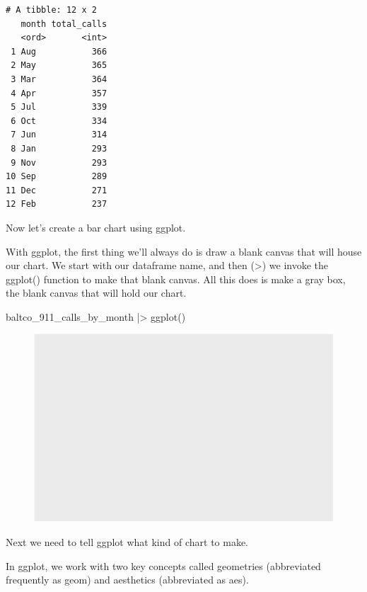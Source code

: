 \documentclass[
  letterpaper,
  DIV=11,
  numbers=noendperiod]{scrreprt}
\newenvironment{Shaded}{\begin{snugshade}}{\end{snugshade}}
\newcommand{\FunctionTok}[1]{\textcolor[rgb]{0.28,0.35,0.67}{#1}}
\newcommand{\NormalTok}[1]{\textcolor[rgb]{0.00,0.23,0.31}{#1}}
\newcommand{\SpecialCharTok}[1]{\textcolor[rgb]{0.37,0.37,0.37}{#1}}
\begin{document}
\begin{verbatim}
# A tibble: 12 x 2
   month total_calls
   <ord>       <int>
 1 Aug           366
 2 May           365
 3 Mar           364
 4 Apr           357
 5 Jul           339
 6 Oct           334
 7 Jun           314
 8 Jan           293
 9 Nov           293
10 Sep           289
11 Dec           271
12 Feb           237
\end{verbatim}

Now let's create a bar chart using ggplot.

With ggplot, the first thing we'll always do is draw a blank canvas that
will house our chart. We start with our dataframe name, and then
(\textbar\textgreater) we invoke the ggplot() function to make that
blank canvas. All this does is make a gray box, the blank canvas that
will hold our chart.

\begin{Shaded}
\begin{Highlighting}[]
\NormalTok{baltco\_911\_calls\_by\_month }\SpecialCharTok{|\textgreater{}}
  \FunctionTok{ggplot}\NormalTok{()}
\end{Highlighting}
\end{Shaded}

\begin{figure}[H]

{\centering \includegraphics{./visualizing-for-reporting_files/figure-pdf/unnamed-chunk-4-1.pdf}

}

\end{figure}

Next we need to tell ggplot what kind of chart to make.

In ggplot, we work with two key concepts called geometries (abbreviated
frequently as geom) and aesthetics (abbreviated as aes).
\end{document}
